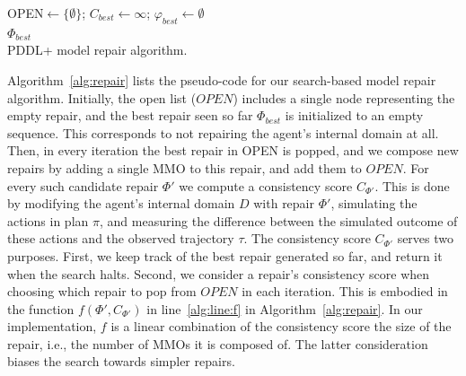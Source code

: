 \documentclass[letterpaper]{article} %
\begin{document}
\begin{algorithm2e}
OPEN$\gets\{\emptyset\}$;
$C_{best}\gets\infty$;
$\varphi_{best}\gets\emptyset$\\
\Return $\varPhi_{best}$\\
\caption{PDDL+ model repair algorithm.}
\label{alg:repair}
\end{algorithm2e}


Algorithm~\ref{alg:repair} lists the pseudo-code for our search-based model repair algorithm.
Initially, the open list ($OPEN$) includes a single node representing the empty repair,
and the best repair seen so far $\varPhi_{best}$ is initialized to an empty sequence.
This corresponds to not repairing the agent's internal domain at all.
Then, in every iteration the best repair in OPEN is popped, and we compose new repairs by adding a single MMO to this repair, and add them to $OPEN$.
For every such candidate repair $\varPhi'$ we compute a consistency score $C_{\varPhi'}$.
This is done by modifying the agent's internal domain $D$ with repair $\varPhi'$, simulating the actions in plan $\pi$, and measuring the difference between the simulated outcome of these actions and the observed trajectory $\tau$.
The consistency score $C_{\varPhi'}$ serves two purposes. First, we keep track of the best repair generated so far, and return it when the search halts. Second, we consider a repair's consistency score when choosing which repair to pop from $OPEN$ in each iteration. This is embodied in the function $f(\varPhi', C_{\varPhi'})$ in line~\ref{alg:line:f} in Algorithm~\ref{alg:repair}.
In our implementation, $f$ is a linear combination of the consistency score the size of the repair, i.e., the number of MMOs it is composed of. The latter consideration biases the search towards simpler repairs.
\end{document}
